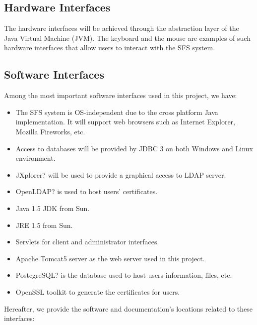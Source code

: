 \subsection{Hardware Interfaces}

The hardware interfaces will be achieved through the abstraction
layer of the Java Virtual Machine (JVM). The keyboard and the mouse
are examples of such hardware interfaces that allow users to
interact with the SFS system.

\subsection{Software Interfaces}

Among the most important software interfaces used in this project,
we have:
\begin{itemize}

\item The SFS  system is OS-independent due to the cross platform Java
implementation. It will support web browsers such as Internet
Explorer, Mozilla Fireworks, etc.

\item Access to databases will be provided by JDBC 3 on both Windows
and Linux environment.

\item JXplorer? will be used to provide a graphical access to LDAP server.

\item OpenLDAP? is used to host users' certificates.

\item Java 1.5 JDK from Sun.

\item JRE 1.5 from Sun.

\item Servlets for client and administrator interfaces.

\item Apache Tomcat5 server as the web server used in this project.

\item PostegreSQL? is the database used to host users information, files,
etc.

\item OpenSSL toolkit to generate the certificates for users.

\end{itemize}

Hereafter, we provide the software and documentation's locations
related to these interfaces:

